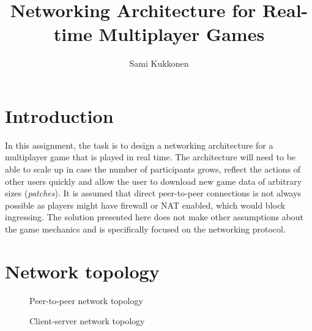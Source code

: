 \documentclass[sigconf, nonacm=true, natbib=false]{acmart}
\begin{document}
\title{Networking Architecture for Real-time Multiplayer Games}
\author{Sami Kukkonen}

\maketitle

\section{Introduction}
In this assignment, the task is to design a networking architecture for a multiplayer game that is played in real time.
The architecture will need to be able to scale up in case the number of participants grows, reflect the actions of other
users quickly and allow the user to download new game data of arbitrary sizes (\emph{patches}). It is assumed that direct peer-to-peer
connections is not always possible as players might have firewall or NAT enabled, which would block ingressing. The
solution presented here does not make other assumptions about the game mechanics and is specifically focused on the
networking protocol.

\section{Network topology}

\begin{figure}
  \centering
  
  \caption{Peer-to-peer network topology}
  \label{fig:topo-p2p}
\end{figure}

\begin{figure}
  \centering
  \caption{Client-server network topology}
  \label{fig:topo-client-server}
\end{figure}
\end{document}
